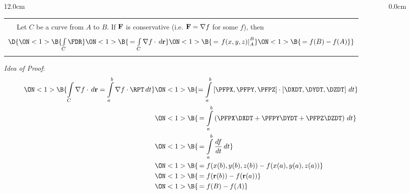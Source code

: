 \begin{frame}
\begin{columns}\begin{column}{12.0cm}

\scriptsize

\begin{center}
{\setlength{\extrarowheight}{-0.1cm}
\begin{tabular}{|p{0.4cm}p{10.6cm}|}
	\hline
	\hline
	&\\
	\THM & Let $C$ be a curve from $A$ to $B$.  If ${\bf F}$ is conservative (i.e. ${\bf F} = \nabla f$ for some $f$), then \\
	& \\
	\multicolumn{2}{|c|}{$\D{
	\ON<1>{\B{\int \limits_{C} \FDR }}
	\ON<1>{\B{\, = \int \limits_{C} \nabla f \cdot \, d{\bf r} }}
	\ON<1>{\B{\, = \left.f(x,y,z)\right|_A^B }}
	\ON<1>{\B{\, = f(B) - f(A)}}}$} \\
	&\\
	\hline
	\hline
\end{tabular}}
\end{center}
{\em Idea of Proof}:  
\begin{align*}
\ON<1>{\B{\int \limits_{C} \nabla f \cdot \, d{\bf r} = \int \limits_{a}^{b} \nabla f \cdot \RPT \, dt }} 
& \ON<1>{\B{= \int \limits_{a}^{b} \left[\PFPX,\PFPY,\PFPZ\right] \cdot \left[\DXDT,\DYDT,\DZDT\right] \, dt}} \\
& \ON<1>{\B{\, = \int \limits_{a}^{b} \left(\PFPX\DXDT + \PFPY\DYDT + \PFPZ\DZDT\right) \, dt}} \\
& \ON<1>{\B{\, = \int \limits_{a}^{b} \frac{df}{dt} \, dt}} \\
& \ON<1>{\B{\, = f(x(b),y(b),z(b)) - f(x(a),y(a),z(a))}} \\
& \ON<1>{\B{\, = f({\bf r}(b)) - f({\bf r}(a))}} \\
& \ON<1>{\B{\, = f(B) - f(A)}} \\
\end{align*}

\vspace{0.2cm}

\end{column}\begin{column}{0.0cm}\end{column}\end{columns}
\end{frame}

